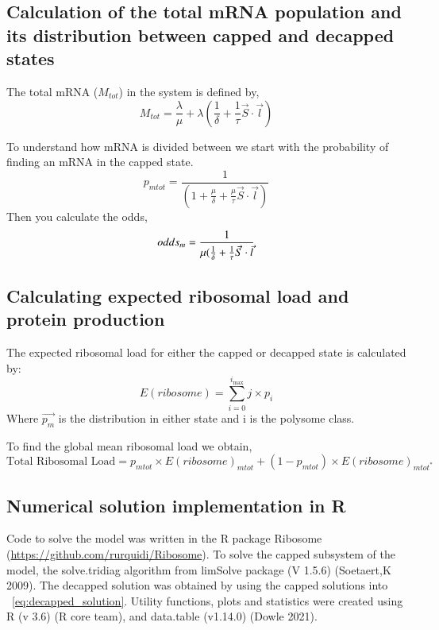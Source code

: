 \documentclass[review]{elsarticle}
\newcommand{\imax}{\ensuremath{i_{\max}}\xspace}
\begin{document}
\subsection{Calculation of the total mRNA population and its distribution between capped and decapped states}
The total mRNA ($M_{tot}$) in the system is defined by,
\begin{equation}
	M_{tot} = \frac{\lambda}{\mu} +  \lambda(\frac{1}{\delta} + \frac{1}{\tau}\vec{S} \cdot \vec{l})
\end{equation}

To understand how mRNA is divided  between we start with the probability of finding an mRNA in the capped state.
\begin{equation*}
	p_{mtot} = \frac{1}{(1  + \frac{\mu}{\delta} + \frac{\mu}{\tau}\vec{S} \cdot \vec{l})}	
\end{equation*}
Then you calculate the odds,
\begin{equation}\label{eq:odds}
	odds_{m} = \frac{1}{\mu(\frac{1}{\delta} + \frac{1}{\tau}\vec{S} \cdot \vec{l}} \\
\end{equation}


\subsection{Calculating expected ribosomal load and protein production}
The expected ribosomal load for either the capped or decapped state is calculated by:
\begin{equation}\label{eq:Expected_ribo_load}
	E(ribosome) =\sum_{i=0}^{\imax}j\times p_{i}
\end{equation}
Where $\vec{p_m}$ is the distribution in either state and i is the polysome class.

To find the global mean ribosomal load we obtain,
\begin{equation}\label{eq:System_ribo_load}
	\text{Total Ribosomal Load} = p_{mtot}\times E(ribosome)_{mtot} + (1-p_{mtot})\times E(ribosome)_{mtot^*}
\end{equation}

\subsection{Numerical solution implementation in R}
Code to solve the model was written in the R package Ribosome (\url{https://github.com/rurquidi/Ribosome}). To solve the capped subsystem of the model, the solve.tridiag algorithm from limSolve package (V 1.5.6) (Soetaert,K 2009). The decapped solution was obtained by using the capped solutions into ~\ref{eq:decapped_solution}. Utility functions, plots and statistics were created using  R (v 3.6) (R core team), and  data.table (v1.14.0) (Dowle 2021). 
		
\end{document}
